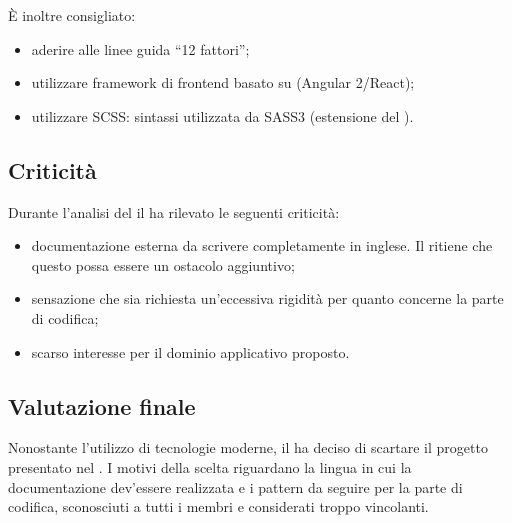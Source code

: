 È inoltre consigliato:
\begin{itemize}
	\item aderire alle linee guida “12 fattori”;
	\item utilizzare framework di frontend basato su  (Angular 2/React);
	\item utilizzare SCSS: sintassi utilizzata da SASS3 (estensione del ).
\end{itemize}


\subsection {Criticità}
Durante l’analisi del  il  ha rilevato le seguenti criticità:
\begin{itemize}
	\item documentazione esterna da scrivere completamente in inglese. Il  ritiene che questo possa essere un ostacolo aggiuntivo;	%
	\item sensazione che sia richiesta un’eccessiva rigidità per quanto concerne la parte di codifica;
	\item scarso interesse per il dominio applicativo proposto.
\end{itemize}

\subsection {Valutazione finale}
Nonostante l’utilizzo di tecnologie moderne, il  ha deciso di scartare il progetto presentato nel . I motivi della scelta riguardano la lingua in cui la documentazione dev’essere realizzata e i pattern da seguire per la parte di codifica, sconosciuti a tutti i membri e considerati troppo vincolanti.
